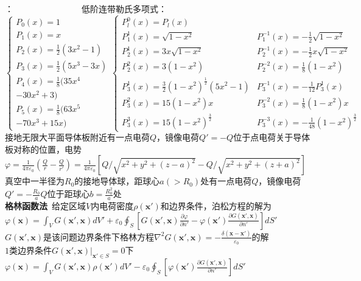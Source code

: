\documentclass[10pt,a4paper]{article}
\begin{document}
\begin{multicols}{2}
：~~~~~~~~~~~~~~~~低阶连带勒氏多项式：\\
$\left\{\begin{array}{l}P_0(x)=1\\P_1(x)=x\\P_2(x)=\frac{1}{2}(3x^2-1)\\P_3(x)=\frac{1}{2}(5x^3-3x)\\P_4(x)=\frac{1}{8}(35x^4\\-30x^2+3)\\P_5(x)=\frac{1}{8}(63x^5\\-70x^3+15x)\end{array}\right.\left\{\begin{array}{ll}P_l^0(x)=P_l(x)\\P_1^1(x)=\sqrt{1-x^2}&P_1^{-1}(x)=-\frac{1}{2}\sqrt{1-x^2}\\P_2^1(x)=3x\sqrt{1-x^2}&P_2^{-1}(x)=-\frac{1}{2}x\sqrt{1-x^2}\\P_2^2(x)=3(1-x^2)&P_2^{-2}(x)=\frac{1}{8}(1-x^2)\\P_3^1(x)=\frac{3}{2}(1-x^2)^{\frac{1}{2}}(5x^2-1)&P_3^{-1}(x)=-\frac{1}{12}P_3^1(x)\\P_3^2(x)=15(1-x^2)x&P_3^{-2}(x)=\frac{1}{8}(1-x^2)x\\P_3^3(x)=15(1-x^2)^{\frac{3}{2}}&P_3^{-3}(x)=-\frac{1}{48}(1-x^2)^{\frac{3}{2}}\end{array}\right.$\\
接地无限大平面导体板附近有一点电荷$Q$，镜像电荷$Q'=-Q$位于点电荷关于导体板对称的位置，电势$\varphi=\frac{1}{4\pi\varepsilon_0}(\frac{Q}{r}-\frac{Q}{r'})=\frac{1}{4\pi\varepsilon_0}[Q/\sqrt{x^2+y^2+(z-a)^2}-Q/\sqrt{x^2+y^2+(z+a)^2}]$\\
真空中一半径为$R_0$的接地导体球，距球心$a(>R_0)$处有一点电荷$Q$，镜像电荷$Q'=-\frac{R_0}{a}Q$位于距球心$b=\frac{R_0^2}{a}$处\\
\textbf{格林函数法}~给定区域$V$内电荷密度$\rho(\bm{x}')$和边界条件，泊松方程的解为\\
\indent$\varphi(\bm{x})=\int_VG(\bm{x}',\bm{x})dV'+\varepsilon_0\oint_S[G(\bm{x}',\bm{x})\frac{\partial\varphi}{\partial n'}-\varphi(\bm{x}')\frac{\partial G(\bm{x}',\bm{x})}{\partial n'}]dS'$\\
$G(\bm{x}',\bm{x})$是该问题边界条件下格林方程$\nabla^2G(\bm{x}',\bm{x})=-\frac{\delta(\bm{x}-\bm{x}')}{\varepsilon_0}$的解\\
$1$类边界条件$G(\bm{x}',\bm{x})|_{\bm{x}'\in S}=0$下\\
\indent\indent$\varphi(\bm{x})=\int_VG(\bm{x}',\bm{x})\rho(\bm{x}')dV'-\varepsilon_0\oint_S[\varphi(\bm{x}')\frac{\partial G(\bm{x}',\bm{x})}{\partial n'}]dS'$\\

\end{multicols}
\end{document}
